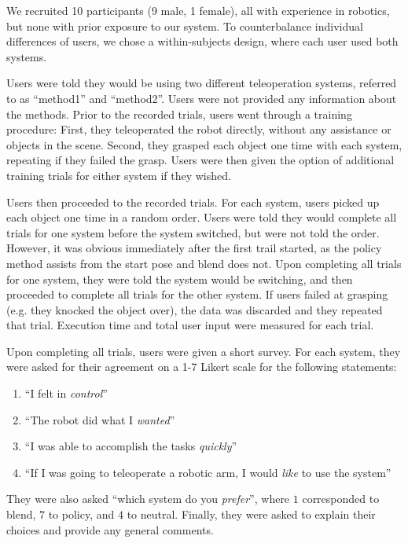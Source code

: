 We recruited 10 participants (9 male, 1 female), all with experience in robotics, but none with prior exposure to our system. To counterbalance individual differences of users, we chose a within-subjects design, where each user used both systems.

Users were told they would be using two different teleoperation systems, referred to as ``method1'' and ``method2''. Users were not provided any information about the methods. Prior to the recorded trials, users went through a training procedure: First, they teleoperated the robot directly, without any assistance or objects in the scene. Second, they grasped each object one time with each system, repeating if they failed the grasp. Users were then given the option of additional training trials for either system if they wished.

Users then proceeded to the recorded trials. For each system, users picked up each object one time in a random order. Users were told they would complete all trials for one system before the system switched, but were not told the order. However, it was obvious immediately after the first trail started, as the policy method assists from the start pose and blend does not. Upon completing all trials for one system, they were told the system would be switching, and then proceeded to complete all trials for the other system. If users failed at grasping (e.g. they knocked the object over), the data was discarded and they repeated that trial. Execution time and total user input were measured for each trial.

Upon completing all trials, users were given a short survey. For each system, they were asked for their agreement on a 1-7 Likert scale for the following statements:
\begin{enumerate}
  \item ``I felt in \emph{control}''
  \item ``The robot did what I \emph{wanted}''
  \item ``I was able to accomplish the tasks \emph{quickly}''
  \item ``If I was going to teleoperate a robotic arm, I would \emph{like} to use the system''
\end{enumerate}

They were also asked ``which system do you \emph{prefer}'', where $1$ corresponded to blend, $7$ to policy, and $4$ to neutral. Finally, they were asked to explain their choices and provide any general comments. %

